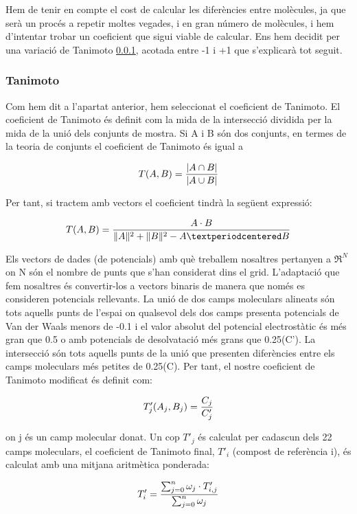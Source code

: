 Hem de tenir en compte el cost de calcular les diferències entre
molècules, ja que serà un procés a repetir moltes vegades, i en gran
número de molècules, i hem d'intentar trobar un coeficient que sigui
viable de calcular.  Ens hem decidit per una variació de Tanimoto
\ref{ssub:Tanimoto}, acotada entre -1 i +1 que s'explicarà tot seguit.


\subsubsection{Tanimoto} %
\label{ssub:Tanimoto}

Com hem dit a l'apartat anterior, hem seleccionat el coeficient de
Tanimoto. El coeficient de Tanimoto és definit com la mida de la
intersecció dividida per la mida de la unió dels conjunts de
mostra. Si A i B són dos conjunts, en termes de la teoria de conjunts
el coeficient de Tanimoto és igual a

$$T(A,B)={|A\cap B| \over |A\cup B|}$$

Per tant, si tractem amb vectors el coeficient tindrà la següent expressió: 

$$T(A,B)={A \cdot B \over \|A\|^{2} + \|B\|^{2} - A·B}$$

Els vectors de dades (de potencials) amb què treballem nosaltres
pertanyen a $\Re^{N}$ on N són el nombre de punts que s'han considerat
dins el grid. L'adaptació que fem nosaltres és convertir-los a vectors
binaris de manera que només es consideren potencials rellevants. La
unió de dos camps moleculars alineats són tots aquells punts de
l'espai on qualsevol dels dos camps presenta potencials de Van der
Waals menors de -0.1 i el valor absolut del potencial electrostàtic és
més gran que 0.5 o amb potencials de desolvatació més grans que
0.25(C'). La intersecció són tots aquells punts de la unió que
presenten diferències entre els camps moleculars més petites de
0.25(C). Per tant, el nostre coeficient de Tanimoto modificat és
definit com:

$$T'_{j}(A_{j},B_{j})={C_{j} \over C'_{j}}$$

on j és un camp molecular donat. Un cop $T'_{j}$ és calculat per
cadascun dels 22 camps moleculars, el coeficient de Tanimoto final,
$T'_{i}$ (compost de referència i), és calculat amb una mitjana
aritmètica ponderada:

$$T'_{i}={\sum_{j=0}^{n} \omega_{j}\cdot T'_{i,j} \over \sum_{j=0}^{n} \omega_{j}}$$

